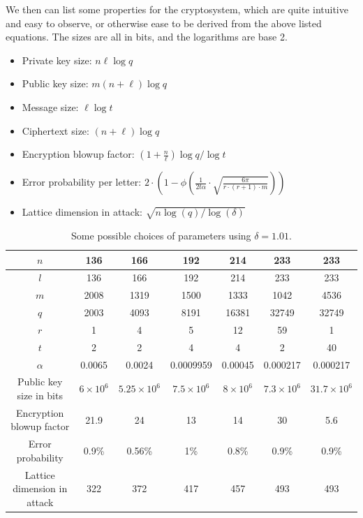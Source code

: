 We then can list some properties for the cryptosystem, which are quite intuitive and easy to observe, or otherwise ease to be derived from the above listed equations. The sizes are all in bits, and the logarithms are base 2.

\begin{itemize}
    \item Private key size: $n \ell \log q$
    \item Public key size: $m(n+\ell) \log q$
    \item Message size: $\ell \log t$
    \item Ciphertext size: $(n+\ell) \log q$
    \item Encryption blowup factor: $\left(1+\frac{n}{\ell}\right) \log q / \log t$
    \item Error probability per letter: $2 \cdot\left(1-\phi\left(\frac{1}{2 t \alpha} \cdot \sqrt{\frac{6 \pi}{r \cdot(r+1) \cdot m}}\right)\right)$
    \item Lattice dimension in attack: $\sqrt{n \log (q) / \log (\delta)}$
\end{itemize}

\begin{table}[!ht]
    \centering
    \begin{tabular}{|c||c|c|c|c|c|c|}
        \hline
        $n$ &136 &166& 192& 214& 233& 233\\\hline
        $l$ &136& 166& 192& 214& 233& 233\\\hline
        $m$ &2008& 1319& 1500& 1333& 1042& 4536\\\hline
        $q$ &2003& 4093& 8191& 16381& 32749& 32749\\\hline
        $r$ &1& 4& 5& 12& 59& 1\\\hline
        $t$ &2& 2&4 &4& 2 &40\\\hline
        $\alpha$ &0.0065& 0.0024& 0.0009959 &0.00045& 0.000217& 0.000217\\\hline
        Public key size in bits&$6\times 10^6$&$5.25\times 10^6$&$7.5\times 10^6$&$8\times 10^6$&$7.3\times 10^6$&$31.7\times 10^6$\\\hline
        Encryption blowup factor &21.9& 24& 13& 14& 30& 5.6\\\hline
        Error probability& 0.9\% &0.56\% &1\% &0.8\% &0.9\% &0.9\%\\\hline
        Lattice dimension in attack &322& 372& 417& 457 &493& 493\\\hline
    \end{tabular}
    \caption{Some possible choices of parameters using $\delta=1.01$.}
\end{table}